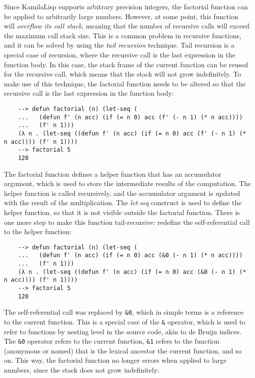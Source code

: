 Since KamilaLisp supports arbitrary precision integers, the factorial function can be applied to arbitrarily large numbers. However, at some point, this function will \textit{overflow its call stack}, meaning that the number of recursive calls will exceed the maximum call stack size. This is a common problem in recursive functions, and it can be solved by using the \textit{tail recursion} technique. Tail recursion is a special case of recursion, where the recursive call is the last expression in the function body. In this case, the stack frame of the current function can be reused for the recursive call, which means that the stack will not grow indefinitely. To make use of this technique, the factorial function needs to be altered so that the recursive call is the last expression in the function body:

\begin{Verbatim}
    --> defun factorial (n) (let-seq (
    ...   (defun f' (n acc) (if (= n 0) acc (f' (- n 1) (* n acc))))
    ...   (f' n 1)))
    (λ n . (let-seq ((defun f' (n acc) (if (= n 0) acc (f' (- n 1) (* n acc)))) (f' n 1))))
    --> factorial 5
    120
\end{Verbatim}

The factorial function defines a helper function that has an accumulator argument, which is used to store the intermediate results of the computation. The helper function is called recursively, and the accumulator argument is updated with the result of the multiplication. The \textit{let-seq} construct is used to define the helper function, so that it is not visible outside the factorial function. There is one more step to make this function tail-recursive: redefine the self-referential call to the helper function:

\begin{Verbatim}
    --> defun factorial (n) (let-seq (
    ...   (defun f' (n acc) (if (= n 0) acc (&0 (- n 1) (* n acc))))
    ...   (f' n 1)))
    (λ n . (let-seq ((defun f' (n acc) (if (= n 0) acc (&0 (- n 1) (* n acc)))) (f' n 1))))
    --> factorial 5
    120
\end{Verbatim}

The self-referential call was replaced by \verb|&0|, which in simple terms is a reference to the current function. This is a special case of the \verb|&| operator, which is used to refer to functions by nesting level in the source code, akin to de Bruijn indices. The \verb|&0| operator refers to the current function, \verb|&1| refers to the function (anonymous or named) that is the lexical ancestor the current function, and so on. This way, the factorial function no longer errors when applied to large numbers, since the stack does not grow indefinitely:

